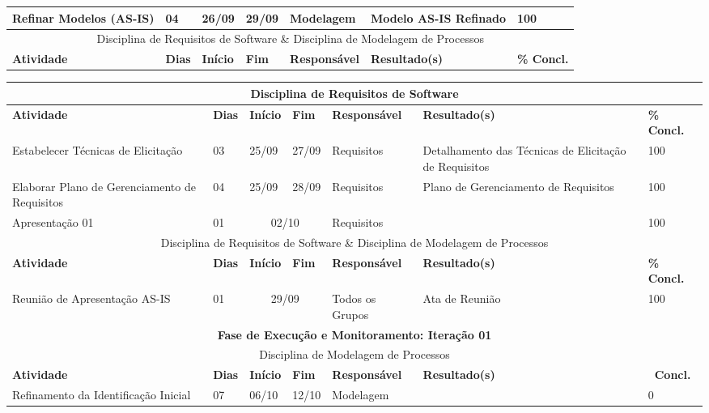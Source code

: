 \begin{landscape}
\begin{center}
\begin{tabular}{|m{6cm}|m{1cm}|m{1cm}|m{1cm}|m{4cm}|m{6cm}|m{2cm}|}
			Refinar Modelos (AS-IS) & 04 & 26/09 & 29/09 & Modelagem & Modelo AS-IS Refinado & 100 \\ \hline
			\multicolumn{7}{|c|}{Disciplina de Requisitos de Software \& Disciplina de Modelagem de Processos} \\
			\hline
			\textbf{Atividade} & \textbf{Dias} & \textbf{Início} & \textbf{Fim} & \textbf{Responsável} & \textbf{Resultado(s)} & \textbf{\% Concl.} \\ \hline
			\end{tabular}
		\end{center}
		\begin{center}
			\begin{tabular}{|m{6cm}|m{1cm}|m{1cm}|m{1cm}|m{4cm}|m{6cm}|m{2cm}|}
			\hline
			\multicolumn{7}{|c|}{Disciplina de Requisitos de Software} \\
			\hline
			\textbf{Atividade} & \textbf{Dias} & \textbf{Início} & \textbf{Fim} & \textbf{Responsável} & \textbf{Resultado(s)} & \textbf{\% Concl.} \\ \hline
			Estabelecer Técnicas de Elicitação & 03 & 25/09 & 27/09 & Requisitos & Detalhamento das Técnicas de Elicitação de Requisitos & 100 \\ \hline
			Elaborar Plano de Gerenciamento de Requisitos & 04 & 25/09 & 28/09 & Requisitos & Plano de Gerenciamento de Requisitos & 100 \\ \hline
			Apresentação 01 & 01 & \multicolumn{2}{c|}{02/10} & Requisitos & & 100 \\ \hline
			\multicolumn{7}{|c|}{Disciplina de Requisitos de Software \& Disciplina de Modelagem de Processos} \\ \hline
			\textbf{Atividade} & \textbf{Dias} & \textbf{Início} & \textbf{Fim} & \textbf{Responsável} & \textbf{Resultado(s)} & \textbf{\% Concl.} \\ \hline
			Reunião de Apresentação AS-IS & 01 & \multicolumn{2}{c|}{29/09} & Todos os Grupos & Ata de Reunião & 100 \\ \hline
			\multicolumn{7}{|c|}{\textbf{Fase de Execução e Monitoramento: Iteração 01}} \\
			\hline
			\multicolumn{7}{|c|}{Disciplina de Modelagem de Processos} \\
			\hline
			\textbf{Atividade} & \textbf{Dias} & \textbf{Início} & \textbf{Fim} & \textbf{Responsável} & \textbf{Resultado(s)} & \textbf{\ Concl.} \\ \hline
			Refinamento da Identificação Inicial & 07 & 06/10 & 12/10 & Modelagem & & 0 \\ \hline

\end{tabular}
\end{center}
\end{landscape}
